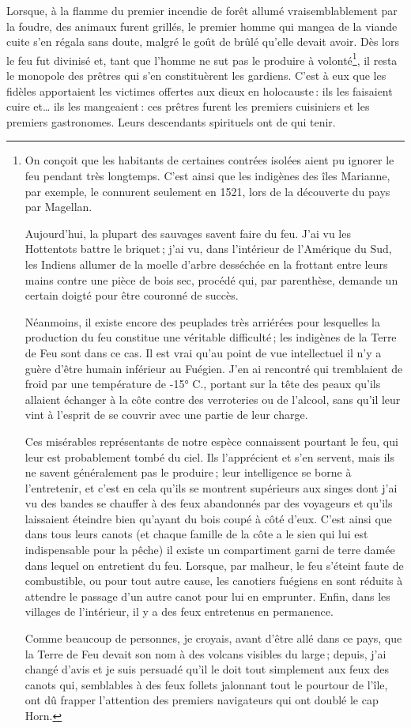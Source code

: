 Lorsque, à la flamme du premier incendie de forêt allumé vraisemblablement par
la foudre, des animaux furent grillés, le premier homme qui mangea de la viande
cuite s'en régala sans doute, malgré le goût de brûlé qu'elle devait avoir. Dès
lors le feu fut divinisé et, tant que l'homme ne sut pas le produire
à volonté\footnote{On conçoit que les habitants de certaines contrées isolées aient pu
ignorer le feu pendant très longtemps. C'est ainsi que les indigènes des îles
Marianne, par exemple, le connurent seulement en 1521, lors de la découverte du
pays par Magellan.

Aujourd'hui, la plupart des sauvages savent faire du feu. J'ai vu les
Hottentots battre le briquet ; j'ai vu, dans l'intérieur de l'Amérique du Sud,
les Indiens allumer de la moelle d'arbre desséchée en la frottant entre leurs
mains contre une pièce de bois sec, procédé qui, par parenthèse, demande un
certain doigté pour être couronné de succès.

Néanmoins, il existe encore des peuplades très arriérées pour lesquelles la
production du feu constitue une véritable difficulté ; les indigènes de la
Terre de Feu sont dans ce cas. Il est vrai qu'au point de vue intellectuel il
n'y a guère d'être humain inférieur au Fuégien. J'en ai rencontré qui
tremblaient de froid par une température de -15° C., portant sur la tête des
peaux qu'ils allaient échanger à la côte contre des verroteries ou de
l'alcool, sans qu'il leur vint à l'esprit de se couvrir avec une partie de leur
charge.

Ces misérables représentants de notre espèce connaissent pourtant le feu, qui
leur est probablement tombé du ciel. Ils l'apprécient et s'en servent, mais ils
ne savent généralement pas le produire ; leur intelligence se borne
à l'entretenir, et c'est en cela qu'ils se montrent supérieurs aux singes dont
j'ai vu des bandes se chauffer à des feux abandonnés par des voyageurs et
qu'ils laissaient éteindre bien qu'ayant du bois coupé à côté d'eux. C'est
ainsi que dans tous leurs canots (et chaque famille de la côte a le sien qui
lui est indispensable pour la pêche) il existe un compartiment garni de terre
damée dans lequel on entretient du feu. Lorsque, par malheur, le feu s'éteint
faute de combustible, ou pour tout autre cause, les canotiers fuégiens en sont
réduits à attendre le passage d'un autre canot pour lui en emprunter. Enfin,
dans les villages de l'intérieur, il y a des feux entretenus en permanence.

Comme beaucoup de personnes, je croyais, avant d'être allé dans ce pays, que la
Terre de Feu devait son nom à des volcans visibles du large ; depuis, j'ai
changé d'avis et je suis persuadé qu'il le doit tout simplement aux feux des
canots qui, semblables à des feux follets jalonnant tout le pourtour de l'île,
ont dû frapper l'attention des premiers navigateurs qui ont doublé le cap
Horn.}, il resta le monopole des prêtres qui s'en constituèrent les gardiens.
C'est à eux que les fidèles apportaient les victimes offertes aux dieux en
holocauste : ils les faisaient cuire et… ils les mangeaient : ces prêtres
furent les premiers cuisiniers et les premiers gastronomes. Leurs descendants
spirituels ont de qui tenir.

